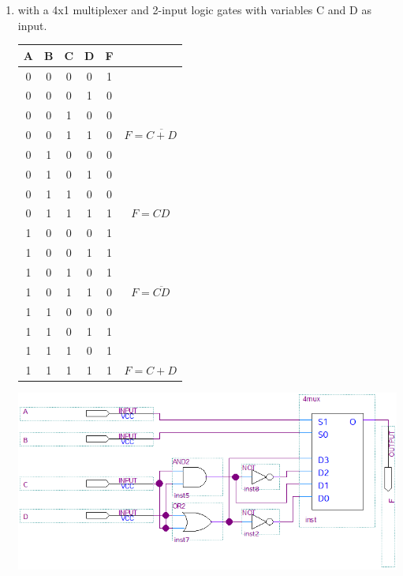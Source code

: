 \documentclass[12pt,letterpaper,titlepage]{report}
\begin{document}
\begin{raggedright}
\begin{enumerate} [label=\alph*)]
\begin{paracol}{2}
\end{paracol}
\item with a 4x1 multiplexer and 2-input logic gates with variables C and D as input.
\begin{paracol}{2}
\def\arraystretch{1.1} 
\begin{tabular}{|cccc|cc|}\hline 
A & B & C & D & F& \\ \hline
0 & 0 & 0 & 0 & 1& \\ 
0 & 0 & 0 & 1 & 0& \\ 
0 & 0 & 1 & 0 & 0& \\ 
0 & 0 & 1 & 1 & 0&$F=\overline{C+D}$ \\ \hline
0 & 1 & 0 & 0 & 0& \\ 
0 & 1 & 0 & 1 & 0& \\  
0 & 1 & 1 & 0 & 0& \\  
0 & 1 & 1 & 1 & 1&$F=CD$ \\ \hline
1 & 0 & 0 & 0 & 1& \\ 
1 & 0 & 0 & 1 & 1& \\  
1 & 0 & 1 & 0 & 1& \\  
1 & 0 & 1 & 1 & 0&$F=\overline{CD}$ \\ \hline 
1 & 1 & 0 & 0 & 0& \\  
1 & 1 & 0 & 1 & 1& \\ 
1 & 1 & 1 & 0 & 1& \\ 
1 & 1 & 1 & 1 & 1&$F=C+D$ \\ \hline
\end{tabular} 
\switchcolumn
\includegraphics[width=0.9\columnwidth, height=\textheight, keepaspectratio=true]{hw6p4b}
\end{paracol}
\end{enumerate}


\clearpage

\end{raggedright}
\end{document}
